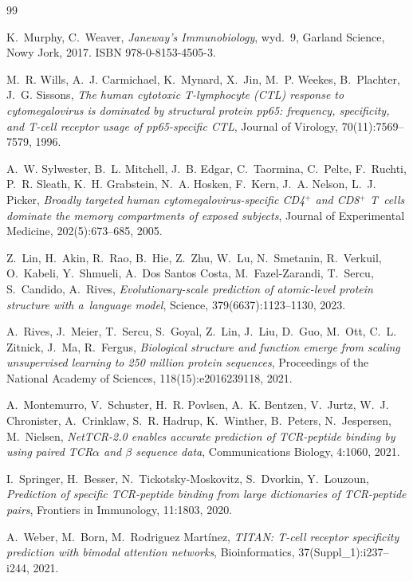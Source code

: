\documentclass{SGGW-thesis}
\begin{document}
\begin{thebibliography}{99}

K.~Murphy, C.~Weaver,
\textit{Janeway's Immunobiology},
wyd.~9, Garland Science, Nowy Jork, 2017. ISBN 978-0-8153-4505-3.

M.~R. Wills, A.~J. Carmichael, K.~Mynard, X.~Jin, M.~P. Weekes, B.~Plachter, J.~G. Sissons,
\textit{The human cytotoxic T-lymphocyte (CTL) response to cytomegalovirus is dominated by structural
protein pp65: frequency, specificity, and T-cell receptor usage of pp65-specific CTL},
Journal of Virology, 70(11):7569--7579, 1996.

A.~W. Sylwester, B.~L. Mitchell, J.~B. Edgar, C.~Taormina, C.~Pelte, F.~Ruchti, P.~R. Sleath,
K.~H. Grabstein, N.~A. Hosken, F.~Kern, J.~A. Nelson, L.~J. Picker,
\textit{Broadly targeted human cytomegalovirus-specific CD4$^+$ and CD8$^+$ T~cells dominate the
memory compartments of exposed subjects},
Journal of Experimental Medicine, 202(5):673--685, 2005.

Z.~Lin, H.~Akin, R.~Rao, B.~Hie, Z.~Zhu, W.~Lu, N.~Smetanin, R.~Verkuil, O.~Kabeli, Y.~Shmueli,
A.~Dos Santos Costa, M.~Fazel-Zarandi, T.~Sercu, S.~Candido, A.~Rives,
\textit{Evolutionary-scale prediction of atomic-level protein structure with a~language model},
Science, 379(6637):1123--1130, 2023.

A.~Rives, J.~Meier, T.~Sercu, S.~Goyal, Z.~Lin, J.~Liu, D.~Guo, M.~Ott, C.~L. Zitnick, J.~Ma,
R.~Fergus,
\textit{Biological structure and function emerge from scaling unsupervised learning to 250 million
protein sequences},
Proceedings of the National Academy of Sciences, 118(15):e2016239118, 2021.

A.~Montemurro, V.~Schuster, H.~R. Povlsen, A.~K. Bentzen, V.~Jurtz, W.~J. Chronister,
A.~Crinklaw, S.~R. Hadrup, K.~Winther, B.~Peters, N.~Jespersen, M.~Nielsen,
\textit{NetTCR-2.0 enables accurate prediction of TCR-peptide binding by using paired TCR$\alpha$
and $\beta$ sequence data},
Communications Biology, 4:1060, 2021.

I.~Springer, H.~Besser, N.~Tickotsky-Moskovitz, S.~Dvorkin, Y.~Louzoun,
\textit{Prediction of specific TCR-peptide binding from large dictionaries of TCR-peptide pairs},
Frontiers in Immunology, 11:1803, 2020.

A.~Weber, M.~Born, M.~Rodriguez Mart{\'i}nez,
\textit{TITAN: T-cell receptor specificity prediction with bimodal attention networks},
Bioinformatics, 37(Suppl\_1):i237--i244, 2021.


\end{thebibliography}
\end{document}
